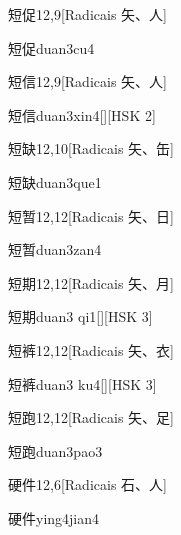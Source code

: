 \begin{entry}{短促}{12,9}[Radicais ⽮、⼈]
  \begin{phonetics}{短促}{duan3cu4}
  \end{phonetics}
\end{entry}

\begin{entry}{短信}{12,9}[Radicais ⽮、⼈]
  \begin{phonetics}{短信}{duan3xin4}[][HSK 2]
  \end{phonetics}
\end{entry}

\begin{entry}{短缺}{12,10}[Radicais ⽮、⽸]
  \begin{phonetics}{短缺}{duan3que1}
  \end{phonetics}
\end{entry}

\begin{entry}{短暂}{12,12}[Radicais ⽮、⽇]
  \begin{phonetics}{短暂}{duan3zan4}
  \end{phonetics}
\end{entry}

\begin{entry}{短期}{12,12}[Radicais ⽮、⽉]
  \begin{phonetics}{短期}{duan3 qi1}[][HSK 3]
  \end{phonetics}
\end{entry}

\begin{entry}{短裤}{12,12}[Radicais ⽮、⾐]
  \begin{phonetics}{短裤}{duan3 ku4}[][HSK 3]
  \end{phonetics}
\end{entry}

\begin{entry}{短跑}{12,12}[Radicais ⽮、⾜]
  \begin{phonetics}{短跑}{duan3pao3}
  \end{phonetics}
\end{entry}

\begin{entry}{硬件}{12,6}[Radicais ⽯、⼈]
  \begin{phonetics}{硬件}{ying4jian4}
  \end{phonetics}
\end{entry}

